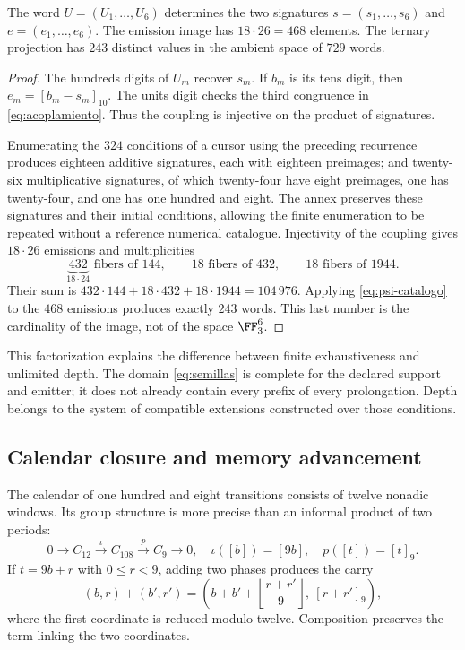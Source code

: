 \begin{proposition}
The word \(U=(U_1,\ldots,U_6)\) determines the two signatures \(s=(s_1,\ldots,s_6)\) and \(e=(e_1,\ldots,e_6)\). The emission image has \(18\cdot26=468\) elements. The ternary projection has \(243\) distinct values in the ambient space of \(729\) words.
\end{proposition}
\begin{proof}
The hundreds digits of \(U_m\) recover \(s_m\). If \(b_m\) is its tens digit, then \(e_m=[b_m-s_m]_{10}\). The units digit checks the third congruence in \eqref{eq:acoplamiento}. Thus the coupling is injective on the product of signatures.

Enumerating the \(324\) conditions of a cursor using the preceding recurrence produces eighteen additive signatures, each with eighteen preimages; and twenty-six multiplicative signatures, of which twenty-four have eight preimages, one has twenty-four, and one has one hundred and eight. The annex preserves these signatures and their initial conditions, allowing the finite enumeration to be repeated without a reference numerical catalogue. Injectivity of the coupling gives \(18\cdot26\) emissions and multiplicities
\[
 \underbrace{432}_{18\cdot24}\text{ fibers of }144,
 \qquad18\text{ fibers of }432,
 \qquad18\text{ fibers of }1944.
\]
Their sum is \(432\cdot144+18\cdot432+18\cdot1944=104\,976\). Applying \eqref{eq:psi-catalogo} to the \(468\) emissions produces exactly \(243\) words. This last number is the cardinality of the image, not of the space \(\FF_3^6\).
\end{proof}

This factorization explains the difference between finite exhaustiveness and unlimited depth. The domain \eqref{eq:semillas} is complete for the declared support and emitter; it does not already contain every prefix of every prolongation. Depth belongs to the system of compatible extensions constructed over those conditions.

\subsection{Calendar closure and memory advancement}

The calendar of one hundred and eight transitions consists of twelve nonadic windows. Its group structure is more precise than an informal product of two periods:
\begin{equation}
 0\longrightarrow C_{12}\xrightarrow{\iota}C_{108}
 \xrightarrow{p}C_9\longrightarrow0,
 \quad\iota([b])=[9b],\quad p([t])=[t]_9.
 \label{eq:extension108}
\end{equation}
If \(t=9b+r\) with \(0\le r<9\), adding two phases produces the carry
\[
 (b,r)+(b',r')=
 \left(b+b'+\left\lfloor\frac{r+r'}9\right\rfloor,\ [r+r']_9\right),
\]
where the first coordinate is reduced modulo twelve. Composition preserves the term linking the two coordinates.

